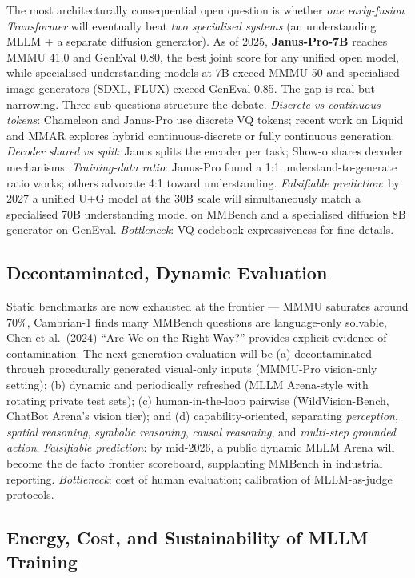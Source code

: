The most architecturally consequential open question is whether \emph{one early-fusion Transformer} will eventually beat \emph{two specialised systems} (an understanding MLLM + a separate diffusion generator). As of 2025, \textbf{Janus-Pro-7B} reaches MMMU 41.0 and GenEval 0.80, the best joint score for any unified open model, while specialised understanding models at 7B exceed MMMU 50 and specialised image generators (SDXL, FLUX) exceed GenEval 0.85. The gap is real but narrowing. Three sub-questions structure the debate. \emph{Discrete vs continuous tokens}: Chameleon and Janus-Pro use discrete VQ tokens; recent work on Liquid and MMAR explores hybrid continuous-discrete or fully continuous generation. \emph{Decoder shared vs split}: Janus splits the encoder per task; Show-o shares decoder mechanisms. \emph{Training-data ratio}: Janus-Pro found a 1:1 understand-to-generate ratio works; others advocate 4:1 toward understanding. \emph{Falsifiable prediction}: by 2027 a unified U+G model at the 30B scale will simultaneously match a specialised 70B understanding model on MMBench and a specialised diffusion 8B generator on GenEval. \emph{Bottleneck}: VQ codebook expressiveness for fine details.

\subsection{Decontaminated, Dynamic Evaluation}\label{decontaminated-dynamic-evaluation}

Static benchmarks are now exhausted at the frontier --- MMMU saturates around 70\%, Cambrian-1 finds many MMBench questions are language-only solvable, Chen et al.~(2024) ``Are We on the Right Way?'' provides explicit evidence of contamination. The next-generation evaluation will be (a) decontaminated through procedurally generated visual-only inputs (MMMU-Pro vision-only setting); (b) dynamic and periodically refreshed (MLLM Arena-style with rotating private test sets); (c) human-in-the-loop pairwise (WildVision-Bench, ChatBot Arena's vision tier); and (d) capability-oriented, separating \emph{perception}, \emph{spatial reasoning}, \emph{symbolic reasoning}, \emph{causal reasoning}, and \emph{multi-step grounded action}. \emph{Falsifiable prediction}: by mid-2026, a public dynamic MLLM Arena will become the de facto frontier scoreboard, supplanting MMBench in industrial reporting. \emph{Bottleneck}: cost of human evaluation; calibration of MLLM-as-judge protocols.

\subsection{Energy, Cost, and Sustainability of MLLM Training}\label{energy-cost-and-sustainability-of-mllm-training}

